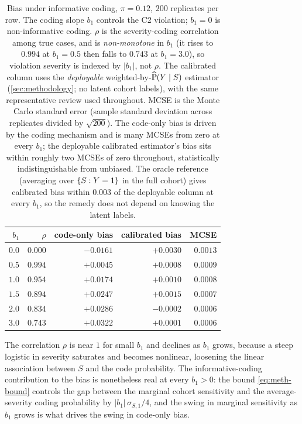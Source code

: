 \begin{table}[ht]
\centering
\begin{tabular}{rrrrr}
\toprule
$b_1$ & $\rho$ & code-only bias & calibrated bias & MCSE \\
\midrule
$0.0$ & $0.000$ & $-0.0161$ & $+0.0030$ & $0.0013$ \\
$0.5$ & $0.994$ & $+0.0045$ & $+0.0008$ & $0.0009$ \\
$1.0$ & $0.954$ & $+0.0174$ & $+0.0010$ & $0.0008$ \\
$1.5$ & $0.894$ & $+0.0247$ & $+0.0015$ & $0.0007$ \\
$2.0$ & $0.834$ & $+0.0286$ & $-0.0002$ & $0.0006$ \\
$3.0$ & $0.743$ & $+0.0322$ & $+0.0001$ & $0.0006$ \\
\bottomrule
\end{tabular}
\caption{Bias under informative coding, $\pi = 0.12$, $200$ replicates
per row. The coding slope $b_1$ controls the C2 violation; $b_1 = 0$ is
non-informative coding. $\rho$ is the severity-coding correlation among
true cases, and is \emph{non-monotone} in $b_1$ (it rises to $0.994$ at
$b_1 = 0.5$ then falls to $0.743$ at $b_1 = 3.0$), so violation
severity is indexed by $|b_1|$, not $\rho$. The calibrated column uses
the \emph{deployable} weighted-by-$\widehat{\mathbb{P}}(Y\mid S)$ estimator
(\cref{sec:methodology}; no latent cohort labels), with the same
representative review used throughout. MCSE is the Monte Carlo
standard error (sample standard deviation across replicates divided by
$\sqrt{200}$). The code-only bias is driven by the coding mechanism and
is many MCSEs from zero at every $b_1$; the deployable calibrated
estimator's bias sits within roughly two MCSEs of zero throughout,
statistically indistinguishable from unbiased. The oracle reference
(averaging over $\{S : Y = 1\}$ in the full cohort) gives calibrated
bias within $0.003$ of the deployable column at every $b_1$, so the
remedy does not depend on knowing the latent labels.}
\label{tab:informative}
\end{table}

The correlation $\rho$ is near $1$ for small $b_1$ and declines as
$b_1$ grows, because a steep logistic in severity saturates and becomes
nonlinear, loosening the linear association between $S$ and the code
probability. The informative-coding contribution to the bias is
nonetheless real at every $b_1 > 0$: the bound \eqref{eq:meth-bound}
controls the gap between the marginal cohort sensitivity and the
average-severity coding probability by $|b_1|\,\sigma_{S,1}/4$, and the
swing in marginal sensitivity as $b_1$ grows is what drives the swing
in code-only bias.

